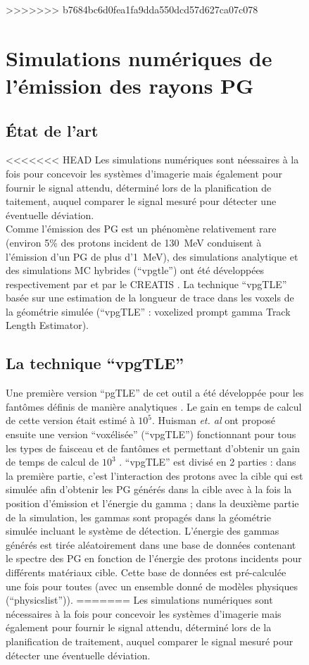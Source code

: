 \documentclass[11pt,a4paper,oldfontcommands]{memoir}
\begin{document}
\begin{figure}


>>>>>>> b7684bc6d0fea1fa9dda550dcd57d627ca07c078

\section{Simulations numériques de l'émission des rayons PG}

\subsection{\'Etat de l'art}

<<<<<<< HEAD
Les simulations numériques sont néessaires à la fois pour concevoir les systèmes d'imagerie mais également pour fournir le signal attendu, déterminé lors de la planification de taitement, auquel comparer le signal mesuré pour détecter une éventuelle déviation. \\
Comme l'émission des PG est un phénomène relativement rare (environ 5\% des protons incident de 130~MeV conduisent à l'émission d'un PG de plus d'1~MeV), des simulations analytique et des simulations MC hybrides (\enquote{vpgtle}) ont été développées respectivement par \cite{Sterpin_2015} et par le CREATIS \cite{Huisman_2016}. La technique \enquote{vpgTLE} basée sur une estimation de la longueur de trace dans les voxels de la géométrie simulée (\enquote{vpgTLE} : voxelized prompt gamma Track Length Estimator).

\subsection{La technique \enquote{vpgTLE}}

Une première version \enquote{pgTLE} de cet outil a été développée pour les fantômes définis de manière analytiques \cite{El_Kanawati_2015}. Le gain en temps de calcul de cette version était estimé à $10^5$. Huisman \textit{et. al} ont proposé ensuite une version \enquote{voxélisée} (\enquote{vpgTLE}) fonctionnant pour tous les types de faisceau et de fantômes et permettant d'obtenir un gain de temps de calcul de $10^3$ \cite{Huisman_2016}. \enquote{vpgTLE} est divisé en 2 parties : dans la première partie, c'est l'interaction des protons avec la cible qui est simulée afin d'obtenir les PG générés dans la cible avec à la fois la position d'émission et l'énergie du gamma  ; dans la deuxième partie de la simulation, les gammas sont propagés dans la géométrie simulée incluant le système de détection. L'énergie des gammas générés est tirée aléatoirement dans une base de données contenant le spectre des PG en fonction de l'énergie des protons incidents pour différents matériaux cible. Cette base de données est pré-calculée une fois pour toutes (avec un ensemble donné de modèles physiques (\enquote{physicslist})).
=======
Les simulations numériques sont nécessaires à la fois pour concevoir les systèmes d'imagerie mais également pour fournir le signal attendu, déterminé lors de la planification de traitement, auquel comparer le signal mesuré pour détecter une éventuelle déviation.


\end{figure}
\end{document}
